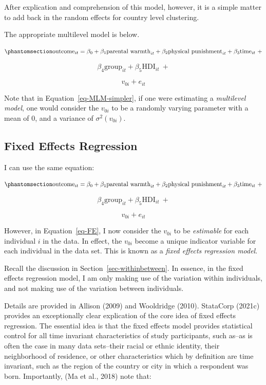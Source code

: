 \documentclass[
  letterpaper,
  DIV=11,
  numbers=noendperiod]{scrreprt}
\begin{document}
After explication and comprehension of this model, however, it is a
simple matter to add back in the random effects for country level
clustering.

The appropriate multilevel model is below.

\begin{equation}\phantomsection\label{eq-MLM-simpler}{\text{outcome}_{it} = \beta_0 + \beta_1 \text{parental warmth}_{it} + \beta_2 \text{physical punishment}_{it} + \beta_3 \text{time}_{it} \ + }\end{equation}

\[\beta_4 \text{group}_{it} + \beta_5 \text{HDI}_{it} \ +\]

\[v_{0i} + e_{it}\]

Note that in Equation~\ref{eq-MLM-simpler}, if one were estimating a
\emph{multilevel model}, one would consider the \(v_{0i}\) to be a
randomly varying parameter with a mean of 0, and a variance of
\(\sigma^2(v_{0i})\).

\subsection{Fixed Effects Regression}\label{fixed-effects-regression}

I can use the same equation:

\begin{equation}\phantomsection\label{eq-FE}{\text{outcome}_{it} = \beta_0 + \beta_1 \text{parental warmth}_{it} + \beta_2 \text{physical punishment}_{it} + \beta_3 \text{time}_{it} \ + }\end{equation}

\[\beta_4 \text{group}_{it} + \beta_5 \text{HDI}_{it} \ +\]

\[v_{0i} + e_{it}\]

However, in Equation~\ref{eq-FE}, I now consider the \(v_{0i}\) to be
\emph{estimable} for each individual \(i\) in the data. In effect, the
\(v_{0i}\) become a unique indicator variable for each individual in the
data set. This is known as a \emph{fixed effects regression model}.

Recall the discussion in Section~\ref{sec-withinbetween}. In essence, in
the fixed effects regression model, I am only making use of the
variation within individuals, and not making use of the variation
between individuals.

Details are provided in Allison (2009) and Wooldridge (2010). StataCorp
(2021c) provides an exceptionally clear explication of the core idea of
fixed effects regression. The essential idea is that the fixed effects
model provides statistical control for all time invariant
characteristics of study participants, such as--as is often the case in
many data sets--their racial or ethnic identity, their neighborhood of
residence, or other characteristics which by definition are time
invariant, such as the region of the country or city in which a
respondent was born. Importantly, (Ma et al., 2018) note that:
\end{document}
